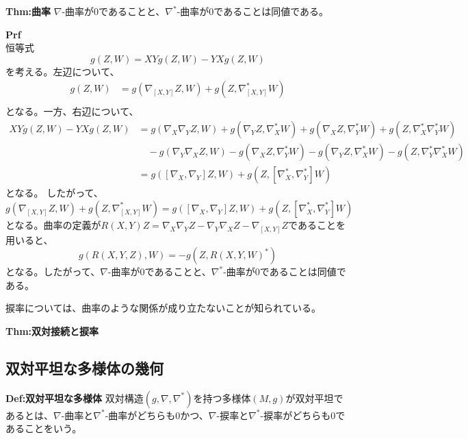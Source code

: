 \documentclass[a4paper,11pt]{jsarticle}
\numberwithin{equation}{section}
\begin{document}
\begin{itembox}[l]{\textbf{Thm:曲率}}
    $\nabla$-曲率が0であることと、$\nabla^*$-曲率が0であることは同値である。

\end{itembox}
\textbf{Prf}\\
恒等式
\begin{equation}
    [X,Y]g(Z,W) = XYg(Z,W) - YXg(Z,W) 
\end{equation}
を考える。左辺について、
\begin{align}
    [X,Y]g(Z,W) &= g(\nabla_{[X,Y]}Z,W) + g(Z,\nabla^*_{[X,Y]}W) \\
\end{align}
となる。一方、右辺について、
\begin{align}
    XYg(Z,W) - YXg(Z,W) &= g(\nabla_X \nabla_Y Z,W) + g(\nabla_Y Z,\nabla_X^* W) + g(\nabla_X Z,\nabla_Y^* W) + g(Z,\nabla^*_X \nabla_Y^* W) \\
    &\quad - g(\nabla_Y \nabla_X Z,W) - g(\nabla_X Z,\nabla_Y^* W) - g(\nabla_Y Z,\nabla_X^* W) - g(Z,\nabla^*_Y \nabla_X^* W) \\
    &= g([\nabla_X,\nabla_Y]Z,W) + g(Z,[\nabla_X^*,\nabla_Y^*]W)
\end{align}
となる。%
したがって、
\begin{equation}
    g(\nabla_{[X,Y]}Z,W) + g(Z,\nabla^*_{[X,Y]}W) = g([\nabla_X,\nabla_Y]Z,W) + g(Z,[\nabla_X^*,\nabla_Y^*]W)
\end{equation}
となる。曲率の定義が$R(X,Y)Z = \nabla_X \nabla_Y Z - \nabla_Y \nabla_X Z - \nabla_{[X,Y]}Z$であることを用いると、
\begin{equation}
    g(R(X,Y,Z),W) = -g(Z,R(X,Y,W)^*)
\end{equation}
となる。したがって、$\nabla$-曲率が0であることと、$\nabla^*$-曲率が0であることは同値である。\hfill\qedsymbol

捩率については、曲率のような関係が成り立たないことが知られている。
\begin{itembox}[l]{\textbf{Thm:双対接続と捩率}}
\end{itembox}

\subsection{双対平坦な多様体の幾何}
\begin{itembox}[l]{\textbf{Def:双対平坦な多様体}}
    双対構造$(g,\nabla,\nabla^*)$を持つ多様体$(M,g)$が双対平坦であるとは、$\nabla$-曲率と$\nabla^*$-曲率がどちらも0かつ、$\nabla$-捩率と$\nabla^*$-捩率がどちらも0であることをいう。

\end{itembox}
\end{document}
